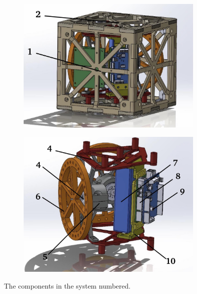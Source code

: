 \begin{figure}
    \centering
    \begin{subfigure}[h]{0.22\textwidth}
        \centering
        \includegraphics[width=\textwidth]{figures/Cube1.jpg}
    \end{subfigure}
    \begin{subfigure}[h]{0.22\textwidth}
        \centering
        \includegraphics[width=\textwidth]{figures/cube2.jpg}
    \end{subfigure}
    \caption{The components in the system numbered.}
    \label{fig:cubediagram}
\end{figure}

